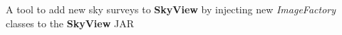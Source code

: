 



\begin{cvparagraph}
    A tool to add new sky surveys to \textbf{SkyView} by injecting new \textit{ImageFactory} classes to the \textbf{SkyView} JAR
\end{cvparagraph}
